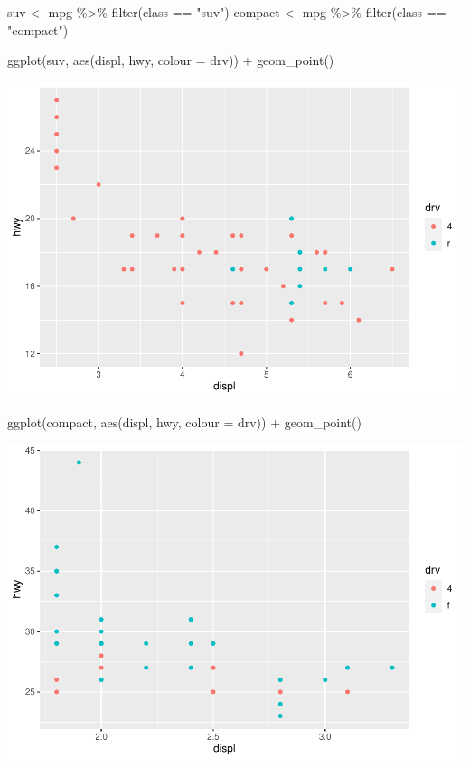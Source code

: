 \documentclass[
]{article}
\newenvironment{Shaded}{\begin{snugshade}}{\end{snugshade}}
\newcommand{\AttributeTok}[1]{\textcolor[rgb]{0.77,0.63,0.00}{#1}}
\newcommand{\FunctionTok}[1]{\textcolor[rgb]{0.00,0.00,0.00}{#1}}
\newcommand{\NormalTok}[1]{#1}
\newcommand{\OtherTok}[1]{\textcolor[rgb]{0.56,0.35,0.01}{#1}}
\newcommand{\SpecialCharTok}[1]{\textcolor[rgb]{0.00,0.00,0.00}{#1}}
\newcommand{\StringTok}[1]{\textcolor[rgb]{0.31,0.60,0.02}{#1}}
\begin{document}
\begin{Shaded}
\begin{Highlighting}[]
\NormalTok{suv }\OtherTok{\textless{}{-}}\NormalTok{ mpg }\SpecialCharTok{\%\textgreater{}\%} \FunctionTok{filter}\NormalTok{(class }\SpecialCharTok{==} \StringTok{"suv"}\NormalTok{)}
\NormalTok{compact }\OtherTok{\textless{}{-}}\NormalTok{ mpg }\SpecialCharTok{\%\textgreater{}\%} \FunctionTok{filter}\NormalTok{(class }\SpecialCharTok{==} \StringTok{"compact"}\NormalTok{)}

\FunctionTok{ggplot}\NormalTok{(suv, }\FunctionTok{aes}\NormalTok{(displ, hwy, }\AttributeTok{colour =}\NormalTok{ drv)) }\SpecialCharTok{+}
  \FunctionTok{geom\_point}\NormalTok{()}
\end{Highlighting}
\end{Shaded}

\includegraphics{Journal_files/figure-latex/unnamed-chunk-67-3.pdf}

\begin{Shaded}
\begin{Highlighting}[]
\FunctionTok{ggplot}\NormalTok{(compact, }\FunctionTok{aes}\NormalTok{(displ, hwy, }\AttributeTok{colour =}\NormalTok{ drv)) }\SpecialCharTok{+}
  \FunctionTok{geom\_point}\NormalTok{()}
\end{Highlighting}
\end{Shaded}

\includegraphics{Journal_files/figure-latex/unnamed-chunk-67-4.pdf}
\end{document}
